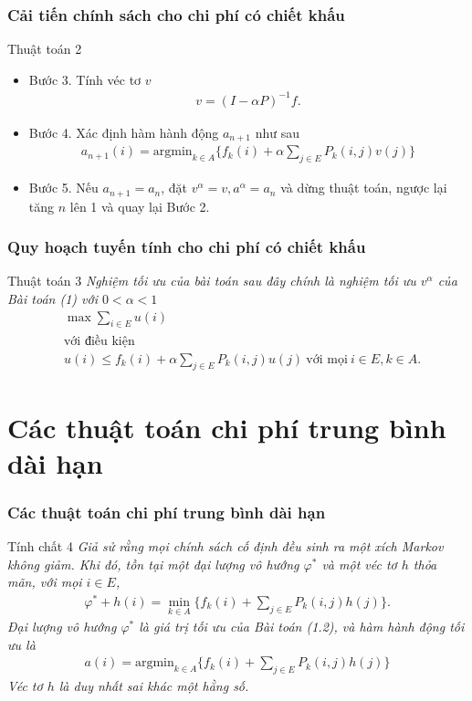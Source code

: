 \documentclass[12pt]{beamer}
\begin{document}
\begin{frame}
	\frametitle{Cải tiến chính sách cho chi phí có
		chiết khấu}
	\begin{exampleblock}{Thuật toán 2}
		\begin{itemize}	
			\item
			Bước 3. Tính véc tơ $v$
			\begin{align*}
			v=(I-\alpha P)^{-1}f.
			\end{align*}
			
			\item
			Bước 4. Xác định hàm hành động $a_{n+1}$ như sau
			\begin{align*}
			a_{n+1}(i)=\mathrm{argmin}_{k \in A}\{f_k(i)+\alpha \sum_{j \in E}P_k(i,j)v(j)\}
			\end{align*}
			
			\item
			Bước 5. Nếu $a_{n+1}=a_n$, đặt $v^\alpha =v, a^\alpha =a_n$ và dừng thuật toán, ngược lại tăng $n$ lên 1 và quay lại Bước 2. 
		\end{itemize}
	\end{exampleblock}
\end{frame}

\begin{frame}
	\frametitle{Quy hoạch tuyến tính cho chi phí có chiết khấu}
	\begin{exampleblock}{Thuật toán 3}
	\textit{ Nghiệm tối ưu của bài toán sau đây chính là nghiệm tối ưu $v^\alpha$ của Bài toán (1) với $0<\alpha<1$
		\begin{align*}
		&\max \sum _{i\in E}u(i)\\
		&\text{với điều kiện } \\
		&u(i)\leq f_k(i)+\alpha \sum_{j \in E}P_k(i,j)u(j) \ \text{với mọi} \ i \in E, k \in A.  
		\end{align*}
	} 
	\end{exampleblock}
\end{frame}

\section{Các thuật toán chi phí trung bình dài hạn}

\begin{frame}
	\frametitle{Các thuật toán chi phí trung bình dài hạn}
\begin{alertblock}{Tính chất 4}
	 \textit{Giả sử rằng mọi chính sách cố định đều sinh ra một xích Markov không giảm. Khi đó, tồn tại một đại lượng vô hướng $\varphi^*$ và một véc tơ $h$ thỏa mãn, với mọi $i \in E$,
		\begin{align}
		\varphi^*+h(i)=\underset{k \in A}{\min}\{f_k(i)+\sum_{j \in E}P_k(i,j)h(j)\}.
		\end{align}
		Đại lượng vô hướng $\varphi ^*$ là giá trị tối ưu của Bài toán (1.2), và hàm hành động tối ưu là
		\begin{align*}
		a(i)=\mathrm{argmin}_{k\in A}\{f_k(i)+\sum_{j\in E}P_k(i,j)h(j)\}
		\end{align*}
		Véc tơ $h$ là duy nhất sai khác một hằng số.
	} 
\end{alertblock}
\end{frame}
\end{document}
